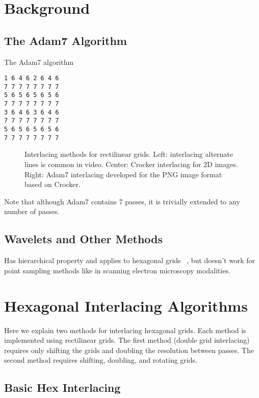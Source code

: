 \documentclass{article}
\begin{document}
\section{Background}
\label{sec:bg}

\subsection{The Adam7 Algorithm}
\label{sec:adam7}

The Adam7 algorithm

\begin{verbatim}
1 6 4 6 2 6 4 6
7 7 7 7 7 7 7 7
5 6 5 6 5 6 5 6
7 7 7 7 7 7 7 7
3 6 4 6 3 6 4 6
7 7 7 7 7 7 7 7
5 6 5 6 5 6 5 6
7 7 7 7 7 7 7 7
\end{verbatim}

\begin{figure}[ht]
\caption{\label{fig:squareinterlacing} Interlacing methods for rectilinear grids. Left: interlacing alternate lines is common in video. Center: Crocker interlacing for 2D images. Right: Adam7 interlacing developed for the PNG image format based on Crocker.}
\end{figure}

Note that although Adam7 contains 7 passes, it is trivially extended to
any number of passes.

\subsection{Wavelets and Other Methods}
\label{sec:wavelets}

Has hierarchical property and applies to hexagonal grids~ \cite{jeevan2014compression}
, but doesn't work for point sampling methods
like in scanning electron microscopy modalities.


\section{Hexagonal Interlacing Algorithms}
\label{sec:hexinter}

Here we explain two methods for interlacing hexagonal grids.
%
Each method is implemented using rectilinear grids.
%
The first method (double grid interlacing) requires only shifting the grids and doubling the resolution between passes.
%
The second method requires shifting, doubling, and rotating grids.


\subsection{Basic Hex Interlacing}
\label{double-grid-interlacing}
\end{document}
